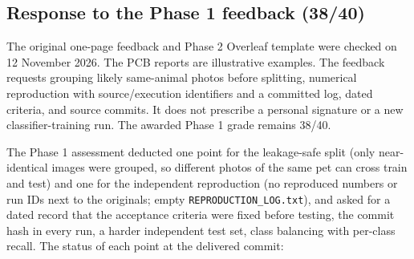 \documentclass[11pt,a4paper]{article}
\begin{document}
\subsection*{Response to the Phase 1 feedback (38/40)}

The original one-page feedback and Phase 2 Overleaf template were checked on 12 November 2026. The PCB reports are illustrative examples. The feedback requests grouping likely same-animal photos before splitting, numerical reproduction with source/execution identifiers and a committed log, dated criteria, and source commits. It does not prescribe a personal signature or a new classifier-training run. The awarded Phase 1 grade remains 38/40.


The Phase 1 assessment deducted one point for the leakage-safe split (only near-identical images were grouped, so different photos of the same pet can cross train and test) and one for the independent reproduction (no reproduced numbers or run IDs next to the originals; empty \texttt{REPRODUCTION\_LOG.txt}), and asked for a dated record that the acceptance criteria were fixed before testing, the commit hash in every run, a harder independent test set, class balancing with per-class recall. The status of each point at the delivered commit:
\end{document}
